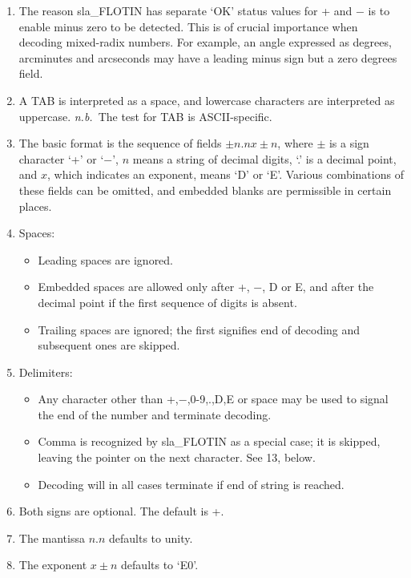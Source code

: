 \documentclass[11pt,twoside,nolof]{starlink}
\begin{document}
{
 \begin{enumerate}
 \item The reason sla\_FLOTIN has separate `OK' status values
       for + and $-$ is to enable minus zero to be detected.
       This is of crucial importance
       when decoding mixed-radix numbers.  For example, an angle
       expressed as degrees, arcminutes and arcseconds may have a
       leading minus sign but a zero degrees field.
 \item A TAB is interpreted as a space, and lowercase characters are
       interpreted as uppercase.  \textit{n.b.}\ The test for TAB is
       ASCII-specific.
 \item The basic format is the sequence of fields $\pm n.n x \pm n$,
       where $\pm$ is a sign
       character `+' or `$-$', $n$ means a string of decimal digits,
       `.' is a decimal point, and $x$, which indicates an exponent,
       means `D' or `E'.  Various combinations of these fields can be
       omitted, and embedded blanks are permissible in certain places.
 \item Spaces:
       \begin{itemize}
       \item Leading spaces are ignored.
       \item Embedded spaces are allowed only after +, $-$, D or E,
             and after the decimal point if the first sequence of
             digits is absent.
       \item Trailing spaces are ignored;  the first signifies
             end of decoding and subsequent ones are skipped.
       \end{itemize}
 \item Delimiters:
       \begin{itemize}
       \item Any character other than +,$-$,0-9,.,D,E or space may be
             used to signal the end of the number and terminate decoding.
       \item Comma is recognized by sla\_FLOTIN as a special case; it
             is skipped, leaving the pointer on the next character.  See
             13, below.
       \item Decoding will in all cases terminate if end of string
             is reached.
       \end{itemize}
 \item Both signs are optional.  The default is +.
 \item The mantissa $n.n$ defaults to unity.
 \item The exponent $x\!\pm\!n$ defaults to `E0'.

\end{enumerate}}
\end{document}
